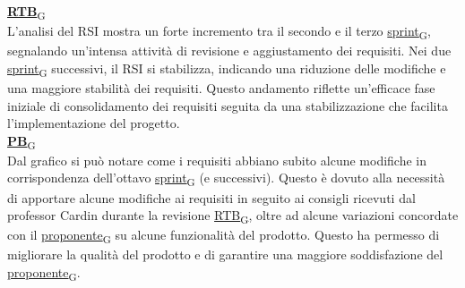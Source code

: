 \begin{flushleft}
\href{https://7last.github.io/docs/pb/documentazione-interna/glossario\#requirements-and-technology-baseline}{\textbf{RTB}\textsubscript{G}} \\
L'analisi del RSI mostra un forte incremento tra il secondo e il terzo \href{https://7last.github.io/docs/pb/documentazione-interna/glossario\#sprint}{sprint\textsubscript{G}}, segnalando un'intensa attività di revisione e aggiustamento dei requisiti. Nei due \href{https://7last.github.io/docs/pb/documentazione-interna/glossario\#sprint}{sprint\textsubscript{G}} successivi, il RSI si stabilizza, indicando una riduzione delle modifiche e una maggiore stabilità dei requisiti. Questo andamento riflette un'efficace fase iniziale di consolidamento dei requisiti seguita da una stabilizzazione che facilita l'implementazione del progetto. \\
\href{https://7last.github.io/docs/pb/documentazione-interna/glossario\#product-baseline}{\textbf{PB}\textsubscript{G}} \\
Dal grafico si può notare come i requisiti abbiano subito alcune modifiche in corrispondenza dell'ottavo \href{https://7last.github.io/docs/pb/documentazione-interna/glossario\#sprint}{sprint\textsubscript{G}} (e successivi). Questo è dovuto alla necessità di apportare alcune modifiche ai requisiti in seguito ai consigli ricevuti dal professor Cardin durante la revisione \href{https://7last.github.io/docs/pb/documentazione-interna/glossario\#requirements-and-technology-baseline}{RTB\textsubscript{G}}, oltre ad alcune variazioni concordate con il \href{https://7last.github.io/docs/pb/documentazione-interna/glossario\#proponente}{proponente\textsubscript{G}} su alcune funzionalità del prodotto. Questo ha permesso di migliorare la qualità del prodotto e di garantire una maggiore soddisfazione del \href{https://7last.github.io/docs/pb/documentazione-interna/glossario\#proponente}{proponente\textsubscript{G}}.
\end{flushleft}
